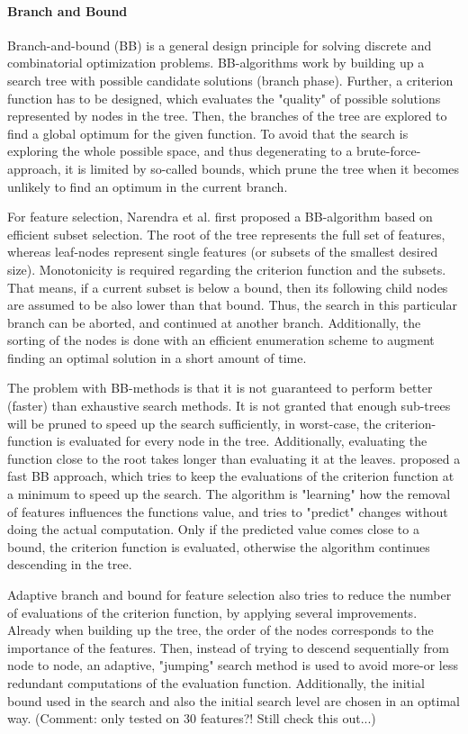 \paragraph{Branch and Bound}
\label{par:methods.flat.wrapper.branch_and_bound}


Branch-and-bound (BB) is a general design principle for solving discrete and combinatorial optimization problems. BB-algorithms work by building up a search tree with possible candidate solutions (branch phase). Further, a criterion function has to be designed, which evaluates the "quality" of possible solutions represented by nodes in the tree. Then, the branches of the tree are explored to find a global optimum for the given function. To avoid that the search is exploring the whole possible space, and thus degenerating to a brute-force-approach, it is limited by so-called bounds, which prune the tree when it becomes unlikely to find an optimum in the current branch. 

For feature selection, Narendra et al. \cite{Narendra:77} first proposed a BB-algorithm based on efficient subset selection. The root of the tree represents the full set of features, whereas leaf-nodes represent single features (or subsets of the smallest desired size). Monotonicity is required regarding the criterion function and the subsets. That means, if a current subset is below a bound, then its following child nodes are assumed to be also lower than that bound. Thus, the search in this particular branch can be aborted, and continued at another branch. Additionally, the sorting of the nodes is done with an efficient enumeration scheme to augment finding an optimal solution in a short amount of time.

The problem with BB-methods is that it is not guaranteed to perform better (faster) than exhaustive search methods. It is not granted that enough sub-trees will be pruned to speed up the search sufficiently, in worst-case, the criterion-function is evaluated for every node in the tree. Additionally, evaluating the function close to the root takes longer than evaluating it at the leaves. \cite{Somol:04} proposed a fast BB approach, which tries to keep the evaluations of the criterion function at a minimum to speed up the search. The algorithm is "learning" how the removal of features influences the functions value, and tries to "predict" changes without doing the actual computation. Only if the predicted value comes close to a bound, the criterion function is evaluated, otherwise the algorithm continues descending in the tree.

Adaptive branch and bound for feature selection \cite{Nakariyakul:07} also tries to reduce the number of evaluations of the criterion function, by applying several improvements. Already when building up the tree, the order of the nodes corresponds to the importance of the features. Then, instead of trying to descend sequentially from node to node, an adaptive, "jumping" search method is used to avoid more-or less redundant computations of the evaluation function. Additionally, the initial bound used in the search and also the initial search level are chosen in an optimal way. (Comment: only tested on 30 features?! Still check this out...)
